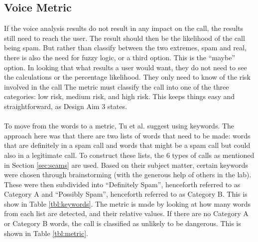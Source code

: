 \documentclass[main.tex]{subfiles}
\begin{document}
\subsection{Voice Metric}
If the voice analysis results do not result in any impact on the call, the results still need to reach the user. The result should then be the likelihood of the call being spam. But rather than classify between the two extremes, spam and real, there is also the need for fuzzy logic, or a third option. This is the ``maybe'' option. In looking that what results a user would want, they do not need to see the calculations or the percentage likelihood. They only need to know of the risk involved in the call The metric must classify the call into one of the three categories: low risk, medium risk, and high risk. This keeps things easy and straightforward, as Design Aim 3 states.
\\\\
To move from the words to a metric, Tu et al. \cite{cisco} suggest using keywords. The approach here was that there are two lists of words that need to be made: words that are definitely in a spam call and words that might be a spam call but could also in a legitimate call. To construct these lists, the 6 types of calls as mentioned in Section \ref{sec:scams} are used. Based on their subject matter, certain keywords were chosen through brainstorming (with the generous help of others in the lab). These were then subdivided into ``Definitely Spam'', henceforth referred to as Category A and ``Possibly Spam'', henceforth referred to as Category B. This is show in Table \ref{tbl:keywords}. The metric is made by looking at how many words from each list are detected, and their relative values. If there are no Category A or Category B words, the call is classified as unlikely to be dangerous. This is shown in Table \ref{tbl:metric}.
\end{document}
